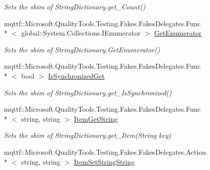 \begin{DoxyCompactItemize}
\begin{DoxyCompactList}\small\item\em Sets the shim of String\-Dictionary.\-get\-\_\-\-Count()\end{DoxyCompactList}\item 
mqttf\-::\-Microsoft.\-Quality\-Tools.\-Testing.\-Fakes.\-Fakes\-Delegates.\-Func\\*
$<$ global\-::\-System.\-Collections.\-I\-Enumerator $>$ \hyperlink{class_system_1_1_collections_1_1_specialized_1_1_fakes_1_1_shim_string_dictionary_a3ca6b7918a49c3d76d1e41190479f87a}{Get\-Enumerator}
\begin{DoxyCompactList}\small\item\em Sets the shim of String\-Dictionary.\-Get\-Enumerator()\end{DoxyCompactList}\item 
mqttf\-::\-Microsoft.\-Quality\-Tools.\-Testing.\-Fakes.\-Fakes\-Delegates.\-Func\\*
$<$ bool $>$ \hyperlink{class_system_1_1_collections_1_1_specialized_1_1_fakes_1_1_shim_string_dictionary_aa7da50d01e9d13fb1cabce7cb7d5e44c}{Is\-Synchronized\-Get}
\begin{DoxyCompactList}\small\item\em Sets the shim of String\-Dictionary.\-get\-\_\-\-Is\-Synchronized()\end{DoxyCompactList}\item 
mqttf\-::\-Microsoft.\-Quality\-Tools.\-Testing.\-Fakes.\-Fakes\-Delegates.\-Func\\*
$<$ string, string $>$ \hyperlink{class_system_1_1_collections_1_1_specialized_1_1_fakes_1_1_shim_string_dictionary_a583209531ea2a940a7038be1bfed4b5c}{Item\-Get\-String}
\begin{DoxyCompactList}\small\item\em Sets the shim of String\-Dictionary.\-get\-\_\-\-Item(\-String key)\end{DoxyCompactList}\item 
mqttf\-::\-Microsoft.\-Quality\-Tools.\-Testing.\-Fakes.\-Fakes\-Delegates.\-Action\\*
$<$ string, string $>$ \hyperlink{class_system_1_1_collections_1_1_specialized_1_1_fakes_1_1_shim_string_dictionary_a390a06ae13137a26a0e4d0d554062c8e}{Item\-Set\-String\-String}

\end{DoxyCompactItemize}
